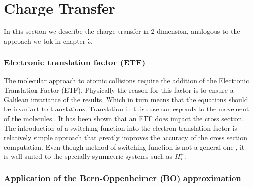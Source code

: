 \chapter{Charge Transfer}

In this section we describe the charge transfer in 2 dimension, analogous to the approach we tok in chapter 3.

\subsection{Electronic translation factor (ETF) \cite{ETF1}\cite{ETF2}\cite{ETF3}}

The molecular approach to atomic collisions require the addition of the Electronic Translation Factor (ETF). Physically the reason for this factor is to ensure a Galilean invariance of the results. Which in turn means that the equations should be invariant to translations. Translation in this case corresponds to the movement of the molecules \cite{ETF2}. It has been shown \cite{ETF2} that an ETF does impact the cross section. 
The introduction of a switching function into the electron translation factor is relatively simple approach that greatly improves the accuracy of the cross section computation. Even though method of switching function is not a general one \cite{ETF3}, it is well suited to the specially symmetric systems such as $ H_{2}^{+} $.

\subsection{Application of the Born-Oppenheimer (BO) approximation}

